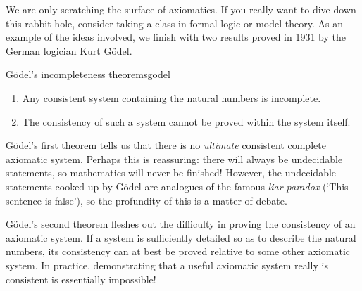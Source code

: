 \vfil


We are only scratching the surface of axiomatics. If you really want to dive down this rabbit hole, consider taking a class in formal logic or model theory. As an example of the ideas involved, we finish with two results proved in 1931 by the German logician Kurt Gödel.


\begin{thm}{Gödel's incompleteness theorems}{godel} 
	\begin{enumerate}
	  \item Any consistent system containing the natural numbers is incomplete.
	  \item The consistency of such a system cannot be proved within the system itself.
	\end{enumerate}
\end{thm}

Gödel's first theorem tells us that there is no \emph{ultimate} consistent complete axiomatic system. Perhaps this is reassuring: there will always be undecidable statements, so mathematics will never be finished! However, the undecidable statements cooked up by Gödel are analogues of the famous \emph{liar paradox} (`This sentence is false'), so the profundity of this is a matter of debate.
\smallbreak

Gödel's second theorem fleshes out the difficulty in proving the consistency of an axiomatic system. If a system is sufficiently detailed so as to describe the natural numbers, its consistency can at best be proved relative to some other axiomatic system. In practice, demonstrating that a useful axiomatic system really is consistent is essentially impossible!


\goodbreak


